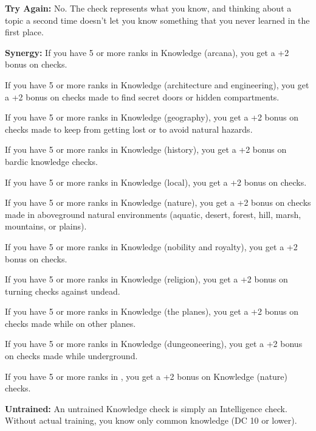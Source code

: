 \textbf{Try Again:} No. The check represents what you know, and thinking about 
a topic a second time doesn't let you know something that you never learned in 
the first place.

\textbf{Synergy:} If you have 5 or more ranks in Knowledge (arcana), you get a 
+2 bonus on  checks.

If you have 5 or more ranks in Knowledge (architecture and engineering), you get 
a +2 bonus on  checks made to find secret doors or hidden compartments.

If you have 5 or more ranks in Knowledge (geography), you get a +2 bonus on  
checks made to keep from getting lost or to avoid natural hazards.

If you have 5 or more ranks in Knowledge (history), you get a +2 bonus on bardic 
knowledge checks.

If you have 5 or more ranks in Knowledge (local), you get a +2 bonus on  checks.

If you have 5 or more ranks in Knowledge (nature), you get a +2 bonus on  
checks made in aboveground natural environments (aquatic, desert, forest, hill, 
marsh, mountains, or plains).

If you have 5 or more ranks in Knowledge (nobility and royalty), you get a +2 bonus 
on  checks.

If you have 5 or more ranks in Knowledge (religion), you get a +2 bonus on turning 
checks against undead.

If you have 5 or more ranks in Knowledge (the planes), you get a +2 bonus on  
checks made while on other planes.

If you have 5 or more ranks in Knowledge (dungeoneering), you get a +2 bonus on 
 checks made while underground.

If you have 5 or more ranks in , you get a +2 bonus on Knowledge (nature) 
checks.

\textbf{Untrained:} An untrained Knowledge check is simply an Intelligence check. 
Without actual training, you know only common knowledge (DC 10 or lower).

